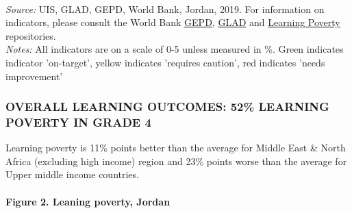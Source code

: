 \documentclass[twocolumn]{article}
\let\oldparagraph\paragraph
\renewcommand{\paragraph}[1]{\oldparagraph{#1}\mbox{}}
\begin{document}
\begin{table}[H]
\\
\color{darkgray}\scriptsize{\textit{Source:} UIS, GLAD, GEPD, World Bank, Jordan, 2019. For information on indicators, please consult the World Bank \href{https://github.com/worldbank/GEPD}{\underline{GEPD}}, \href{https://github.com/worldbank/GLAD}{\underline{GLAD}} and \href{https://github.com/worldbank/LearningPoverty}{\underline{Learning Poverty}} repositories.}\\
\color{darkgray}\scriptsize{\textit{Notes:} All indicators are on a scale of 0-5 unless measured in \%. Green indicates indicator 'on-target', yellow indicates 'requires caution', red indicates 'needs improvement'}
\end{table}
\raggedbottom

\hypertarget{overall-learning-outcomes-52-learning-poverty-in-grade-4}{%
\subsubsection{\texorpdfstring{\textbf{OVERALL LEARNING OUTCOMES: 52\%
LEARNING POVERTY IN GRADE
4}}{OVERALL LEARNING OUTCOMES: 52\% LEARNING POVERTY IN GRADE 4}}\label{overall-learning-outcomes-52-learning-poverty-in-grade-4}}

Learning poverty is 11\% points better than the average for Middle East
\& North Africa (excluding high income) region and 23\% points worse
than the average for Upper middle income countries.

\hypertarget{figure-2.-leaning-poverty-jordan}{%
\paragraph{Figure 2. Leaning poverty,
Jordan}\label{figure-2.-leaning-poverty-jordan}}
\end{document}
